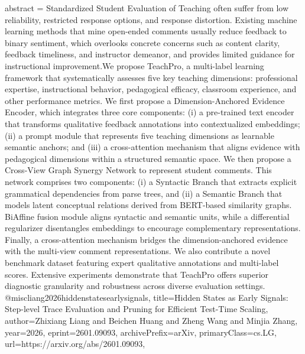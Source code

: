 {      abstract = {Standardized Student Evaluation of Teaching often suffer from low reliability, restricted response options, and response distortion. Existing machine learning methods that mine open-ended comments usually reduce feedback to binary sentiment, which overlooks concrete concerns such as content clarity, feedback timeliness, and instructor demeanor, and provides limited guidance for instructional improvement.We propose TeachPro, a multi-label learning framework that systematically assesses five key teaching dimensions: professional expertise, instructional behavior, pedagogical efficacy, classroom experience, and other performance metrics. We first propose a Dimension-Anchored Evidence Encoder, which integrates three core components: (i) a pre-trained text encoder that transforms qualitative feedback annotations into contextualized embeddings; (ii) a prompt module that represents five teaching dimensions as learnable semantic anchors; and (iii) a cross-attention mechanism that aligns evidence with pedagogical dimensions within a structured semantic space. We then propose a Cross-View Graph Synergy Network to represent student comments. This network comprises two components: (i) a Syntactic Branch that extracts explicit grammatical dependencies from parse trees, and (ii) a Semantic Branch that models latent conceptual relations derived from BERT-based similarity graphs. BiAffine fusion module aligns syntactic and semantic units, while a differential regularizer disentangles embeddings to encourage complementary representations. Finally, a cross-attention mechanism bridges the dimension-anchored evidence with the multi-view comment representations. We also contribute a novel benchmark dataset featuring expert qualitative annotations and multi-label scores. Extensive experiments demonstrate that TeachPro offers superior diagnostic granularity and robustness across diverse evaluation settings.}
}@misc{liang2026hiddenstatesearlysignals,
      title={Hidden States as Early Signals: Step-level Trace Evaluation and Pruning for Efficient Test-Time Scaling}, 
      author={Zhixiang Liang and Beichen Huang and Zheng Wang and Minjia Zhang},
      year={2026},
      eprint={2601.09093},
      archivePrefix={arXiv},
      primaryClass={cs.LG},
      url={https://arxiv.org/abs/2601.09093},
}

